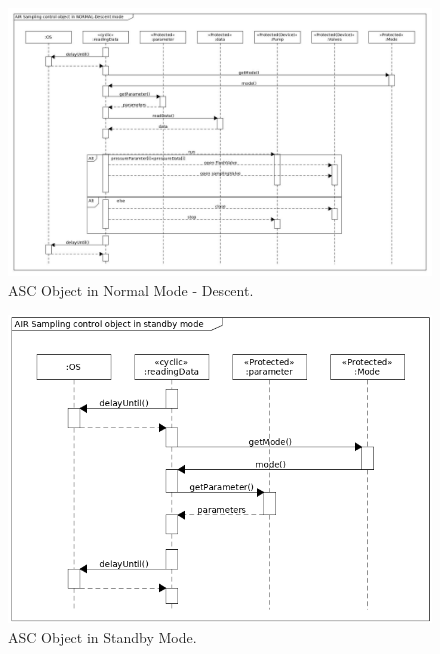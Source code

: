 \documentclass[a4paper,12pt,oneside]{article} %
\providecommand{\DIFaddbeginFL}{} %
\providecommand{\DIFaddendFL}{} %
\providecommand{\DIFdelbeginFL}{} %
\providecommand{\DIFdelendFL}{} %
\newcommand{\DIFscaledelfig}{0.5}
\newlength{\DIFdelgraphicswidth} %
\newlength{\DIFdelgraphicsheight} %
\newcommand{\DIFaddincludegraphics}[2][]{{\color{blue}\fbox{\DIFOincludegraphics[#1]{#2}}}} %
\newcommand{\DIFdelincludegraphics}[2][]{%
\sbox{\DIFdelgraphicsbox}{\DIFOincludegraphics[#1]{#2}}%
\settoboxwidth{\DIFdelgraphicswidth}{\DIFdelgraphicsbox} %
\settoboxtotalheight{\DIFdelgraphicsheight}{\DIFdelgraphicsbox} %
\scalebox{\DIFscaledelfig}{%
\parbox[b]{\DIFdelgraphicswidth}{\usebox{\DIFdelgraphicsbox}\\[-\baselineskip] \rule{\DIFdelgraphicswidth}{0em}}\llap{\resizebox{\DIFdelgraphicswidth}{\DIFdelgraphicsheight}{%
\setlength{\unitlength}{\DIFdelgraphicswidth}%
\begin{picture}(1,1)%
\thicklines\linethickness{2pt} %
{\color[rgb]{1,0,0}\put(0,0){\framebox(1,1){}}}%
{\color[rgb]{1,0,0}\put(0,0){\line( 1,1){1}}}%
{\color[rgb]{1,0,0}\put(0,1){\line(1,-1){1}}}%
\end{picture}%
}\hspace*{3pt}}} %
} %
\DeclareRobustCommand{\DIFaddbeginFL}{\DIFOaddbeginFL \let\includegraphics\DIFaddincludegraphics} %
\DeclareRobustCommand{\DIFaddendFL}{\DIFOaddendFL \let\includegraphics\DIFOincludegraphics} %
\DeclareRobustCommand{\DIFdelbeginFL}{\DIFOdelbeginFL \let\includegraphics\DIFdelincludegraphics} %
\DeclareRobustCommand{\DIFdelendFL}{\DIFOaddendFL \let\includegraphics\DIFOincludegraphics} %
\begin{document}
\begin{appendices}
\begin{landscape}
\begin{figure}[H]
    \centering
    \DIFdelbeginFL %
\DIFdelendFL \DIFaddbeginFL \includegraphics[height=0.9\textwidth]{appendix/img/softwareDiagrams/ASC-seq-dia-v1-3-descent.jpg}
    \DIFaddendFL \caption{ASC Object in Normal Mode - Descent.}
    \label{ASCb}
\end{figure}
\begin{figure}[H]
    \centering
    \includegraphics[height=0.9\textwidth]{appendix/img/ASC-seq-dia-v1-2-c.png}
    \caption{ASC Object in Standby Mode.}
    \label{ASCb}
\end{figure}

\end{landscape}
\end{appendices}
\end{document}
